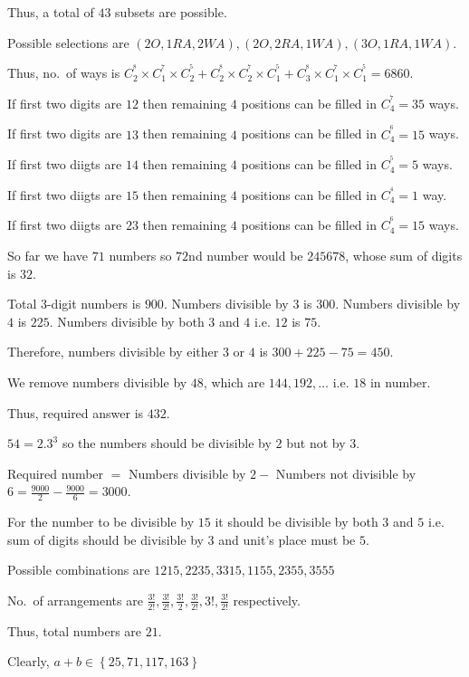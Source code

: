   Thus, a total of $43$ subsets are possible.
\item Possible selections are $(2O, 1RA, 2WA), (2O, 2RA, 1WA), (3O, 1RA, 1WA)$.

  Thus, no.\ of ways is $C_2^^8\times C_1^^7\times C_2^^5 + C_2^^8\times C_2^^7\times C_1^^5 + C_3^^8\times
  C_1^^7\times C_1^^5 = 6860$.
\item If first two digits are $12$ then remaining $4$ positions can be filled in $C_4^^7 = 35$ ways.

  If first two digits are $13$ then remaining $4$ positions can be filled in $C_4^^6 = 15$ ways.

  If first two diigts are $14$ then remaining $4$ positions can be filled in $C_4^^5 = 5$ ways.

  If first two diigts are $15$ then remaining $4$ positions can be filled in $C_4^^4 = 1$ way.

  If first two diigts are $23$ then remaining $4$ positions can be filled in $C_4^^6 = 15$ ways.

  So far we have $71$ numbers so $72$nd number would be $245678$, whose sum of digits is $32$.
\item Total $3$-digit numbers is $900$. Numbers divisible by $3$ is $300$. Numbers divisible by $4$ is
  $225$. Numbers divisible by both $3$ and $4$ i.e. $12$ is $75$.

  Therefore, numbers divisible by either $3$ or $4$ is $300 + 225 - 75 = 450$.

  We remove numbers divisible by $48$, which are $144, 192, \ldots $ i.e. $18$ in number.

  Thus, required answer is $432$.
\item $54 = 2.3^3$ so the numbers should be divisible by $2$ but not by $3$.

  Required number $=$ Numbers divisible by $2 -$ Numbers not divisible by $6 = \frac{9000}{2}
  - \frac{9000}{6} = 3000$.
\item For the number to be divisible by $15$ it should be divisible by both $3$ and $5$ i.e. sum of digits
  should be divisible by $3$ and unit's place must be $5$.

  Possible combinations are $1215, 2235, 3315, 1155, 2355, 3555$

  No.\ of arrangements are $\frac{3!}{2!}, \frac{3!}{2!}, \frac{3!}{2}, \frac{3!}{2!}, 3!, \frac{3!}{2!}$
  respectively.

  Thus, total numbers are $21$.
\item Clearly, $a + b\in\left\{25, 71, 117, 163\right\}$

